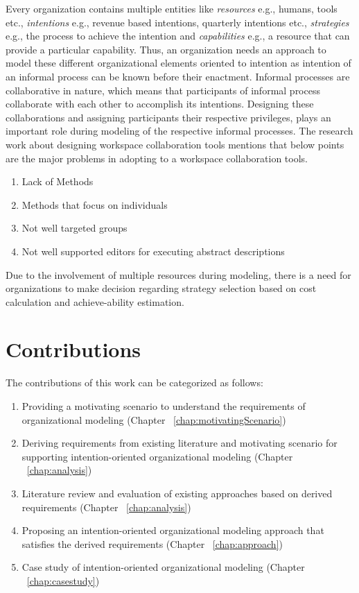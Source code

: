 Every organization contains multiple entities like \textit{resources} e.g., humans, tools etc., \textit{intentions} e.g., revenue based intentions, quarterly intentions etc., \textit{strategies} e.g., the process to achieve the intention and \textit{capabilities} e.g., a resource that can provide a particular capability. Thus, an organization needs an approach to model these different organizational elements oriented to intention as intention of an informal process can be known before their enactment. Informal processes are collaborative in nature, which means that participants of informal process collaborate with each other to accomplish its intentions\cite{Sungur2015}. Designing these collaborations and assigning participants their respective privileges, plays an important role during modeling of the respective informal processes. The research work about designing workspace collaboration tools \cite{Matthews2011} mentions that below points are the major problems in adopting to a workspace collaboration tools.

\begin{enumerate}
	\item Lack of Methods
	\item Methods that focus on individuals
	\item Not well targeted groups
	\item Not well supported editors for executing abstract descriptions
\end{enumerate}

Due to the involvement of multiple resources during modeling, there is a need for organizations to make decision regarding strategy selection based on cost calculation and achieve-ability estimation. 


\section {Contributions}
\label{sec:researchobjectives}
The contributions of this work can be categorized as follows:

\begin{enumerate}
	\item Providing a motivating scenario to understand the requirements of organizational modeling (Chapter ~\ref{chap:motivatingScenario})
 	\item Deriving requirements from existing literature and motivating scenario for supporting intention-oriented organizational modeling (Chapter  ~\ref{chap:analysis})
 	\item Literature review and evaluation of existing approaches based on derived requirements (Chapter ~\ref{chap:analysis})
 	\item Proposing an intention-oriented organizational modeling approach that satisfies the derived requirements (Chapter ~\ref{chap:approach})
 	\item Case study of intention-oriented organizational modeling (Chapter ~\ref{chap:casestudy})
\end{enumerate}
 

